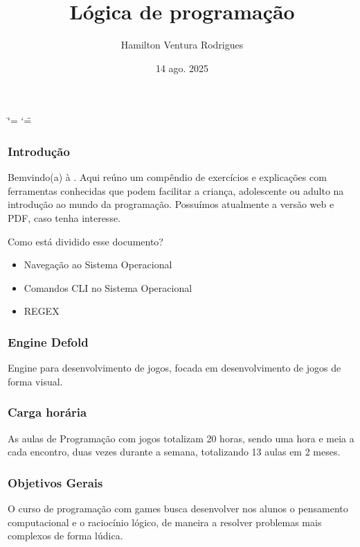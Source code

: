 \documentclass[letterpaper,10pt,brazil]{sphinxmanual}
\title{Lógica de programação}
\date{14 ago. 2025}
\author{Hamilton Ventura Rodrigues}
\begin{document}
\ifdefined\shorthandoff
  \ifnum\catcode`\=\string=\active\shorthandoff{=}\fi
  \ifnum\catcode`\"=\active{}\fi
\fi

\pagestyle{empty}
\sphinxmaketitle
\pagestyle{plain}
\sphinxtableofcontents
\pagestyle{normal}
\label{\detokenize{index::doc}}

\subsubsection*{Introdução}

\sphinxAtStartPar
Bem\sphinxhyphen{}vindo(a) à . Aqui reúno um compêndio de exercícios e
explicações com ferramentas conhecidas que podem facilitar a criança, adolescente ou adulto na
introdução ao mundo da programação. Possuímos atualmente a versão web e PDF, caso tenha interesse.

\sphinxAtStartPar
Como está dividido esse documento?
\begin{itemize}
\item {} 
\sphinxAtStartPar
Navegação ao Sistema Operacional

\item {} 
\sphinxAtStartPar
Comandos CLI no Sistema Operacional

\item {} 
\sphinxAtStartPar
REGEX

\end{itemize}
\subsubsection*{Engine Defold}

\sphinxAtStartPar
Engine para desenvolvimento de jogos, focada em desenvolvimento de jogos de forma visual.
\subsubsection*{Carga horária}

\sphinxAtStartPar
As aulas de Programação com jogos totalizam 20 horas, sendo uma hora e meia a cada
encontro, duas vezes durante a semana, totalizando 13 aulas em 2 meses.
\subsubsection*{Objetivos Gerais}

\sphinxAtStartPar
O curso de programação com games busca desenvolver nos alunos o pensamento
computacional e o raciocínio lógico, de maneira a resolver problemas mais complexos de
forma lúdica.
\end{document}
